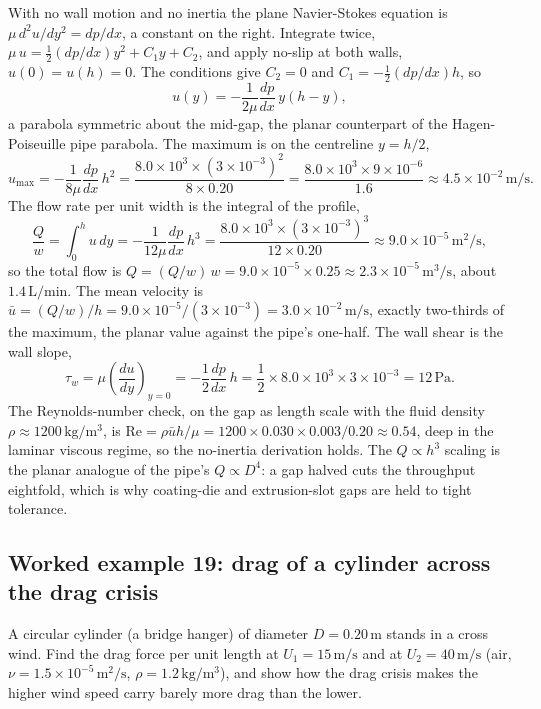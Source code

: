 With no wall motion and no inertia the plane Navier-Stokes equation is
$\mu\,d^2u/dy^2 = dp/dx$, a constant on the right. Integrate twice,
$\mu\,u = \tfrac12(dp/dx)y^2 + C_1 y + C_2$, and apply no-slip at both
walls, $u(0) = u(h) = 0$. The conditions give $C_2 = 0$ and
$C_1 = -\tfrac12(dp/dx)h$, so
\[
u(y) = -\frac{1}{2\mu}\frac{dp}{dx}\,y(h - y),
\]
a parabola symmetric about the mid-gap, the planar counterpart of the
Hagen-Poiseuille pipe parabola. The maximum is on the centreline
$y = h/2$,
\[
u_{\max} = -\frac{1}{8\mu}\frac{dp}{dx}\,h^2 = \frac{8.0\times10^{3}
\times(3\times10^{-3})^2}{8\times0.20} = \frac{8.0\times10^{3}\times
9\times10^{-6}}{1.6} \approx 4.5\times10^{-2}\,\si{\meter\per\second}.
\]
The flow rate per unit width is the integral of the profile,
\[
\frac{Q}{w} = \int_0^h u\,dy = -\frac{1}{12\mu}\frac{dp}{dx}\,h^3 =
\frac{8.0\times10^{3}\times(3\times10^{-3})^3}{12\times0.20} \approx
9.0\times10^{-5}\,\si{\meter\squared\per\second},
\]
so the total flow is $Q = (Q/w)\,w = 9.0\times10^{-5}\times0.25 \approx
2.3\times10^{-5}\,\si{\meter\cubed\per\second}$, about
$1.4\,\text{L/min}$. The mean velocity is $\bar u = (Q/w)/h = 9.0\times
10^{-5}/(3\times10^{-3}) = 3.0\times10^{-2}\,\si{\meter\per\second}$,
exactly two-thirds of the maximum, the planar value against the
pipe's one-half. The wall shear is the wall slope,
\[
\tau_w = \mu\left(\frac{du}{dy}\right)_{y=0} = -\frac12\frac{dp}{dx}\,h
= \frac12\times8.0\times10^{3}\times3\times10^{-3} = 12\,\si{\pascal}.
\]
The Reynolds-number check, on the gap as length scale with the fluid
density $\rho\approx1200\,\si{\kilogram\per\meter\cubed}$, is
$\text{Re} = \rho\bar u h/\mu = 1200\times0.030\times0.003/0.20\approx
0.54$, deep in the laminar viscous regime, so the no-inertia derivation
holds. The $Q\propto h^3$ scaling is the planar analogue of the pipe's
$Q\propto D^4$: a gap halved cuts the throughput eightfold, which is
why coating-die and extrusion-slot gaps are held to tight tolerance.

\subsection*{Worked example 19: drag of a cylinder across the drag crisis}

A circular cylinder (a bridge hanger) of diameter $D = 0.20\,\si{
\meter}$ stands in a cross wind. Find the drag force per unit length at
$U_1 = 15\,\si{\meter\per\second}$ and at $U_2 = 40\,\si{\meter\per
\second}$ (air, $\nu = 1.5\times10^{-5}\,\si{\meter}^2/\si{\second}$,
$\rho = 1.2\,\si{\kilogram\per\meter\cubed}$), and show how the drag
crisis makes the higher wind speed carry barely more drag than the
lower.

